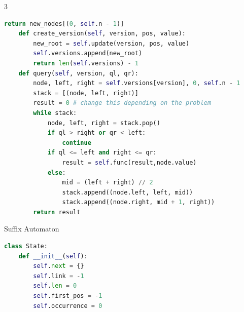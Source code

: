 \documentclass[10pt,landscape, a4paper]{article}
\begin{document}
\begin{multicols*}{3}
\begin{lstlisting}[language=Python]
        return new_nodes[(0, self.n - 1)]
    def create_version(self, version, pos, value):
        new_root = self.update(version, pos, value)
        self.versions.append(new_root)
        return len(self.versions) - 1
    def query(self, version, ql, qr):
        node, left, right = self.versions[version], 0, self.n - 1
        stack = [(node, left, right)]
        result = 0 # change this depending on the problem
        while stack:
            node, left, right = stack.pop()
            if ql > right or qr < left:
                continue
            if ql <= left and right <= qr:
                result = self.func(result,node.value)
            else:
                mid = (left + right) // 2
                stack.append((node.left, left, mid))
                stack.append((node.right, mid + 1, right))
        return result
\end{lstlisting}

Suffix Automaton
\begin{lstlisting}[language=Python]
class State:
    def __init__(self):
        self.next = {}
        self.link = -1
        self.len = 0
        self.first_pos = -1
        self.occurrence = 0


\end{lstlisting}
\end{multicols*}
\end{document}

